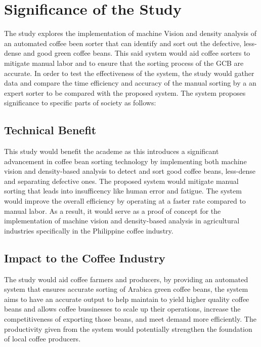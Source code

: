 \section{Significance of the Study}

The study explores the implementation of machine Vision and density analysis of an automated coffee been sorter that can identify and sort out the defective, less-dense and good green coffee beans. This said system would aid coffee sorters to mitigate manual labor and to ensure that the sorting process of the GCB are accurate. In order to test the effectiveness of the system, the study would gather data and compare the time efficiency and accuracy of the manual sorting by a an expert sorter to be compared with the proposed system. The system proposes significance to specific parts of society as follows: 

\subsection{Technical Benefit}

This study would benefit the academe as this introduces a significant advancement in coffee bean sorting technology by implementing both machine vision and density-based analysis to detect and sort good coffee beans, less-dense and separating defective ones. The proposed system would mitigate manual sorting that leads into insufficency like human error and fatigue. The system would improve the overall efficiency by operating at a faster rate compared to manual labor. As a result, it would serve as a proof of concept for the implementation of machine vision and  density-based analysis in agricultural  industries specifically in the Philippine coffee industry. 

\subsection{Impact to the Coffee Industry}

The study would aid coffee farmers and producers, by providing an automated system that ensures accurate sorting of Arabica green coffee beans, the system aims to have an accurate output to help maintain to yield higher quality coffee beans and allows coffee bussinesses to scale up their operations, increase the competitiveness of  exporting those beans, and meet demand more efficiently. The productivity given from the system would potentially strengthen the foundation of local coffee producers.  

